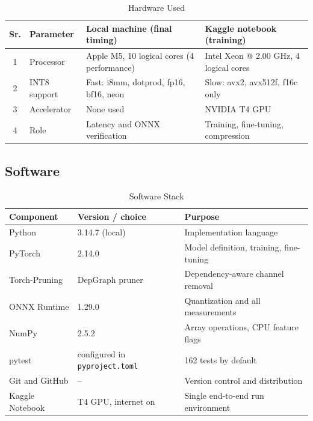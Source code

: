 \documentclass[oneside,a4paper,12pt]{report}
\newcommand{\code}[1]{\texttt{\small #1}}
\begin{document}
\begin{table}[!htbp]
\centering
\small
\begin{tabularx}{\textwidth}{@{}c l X X@{}}
\toprule
Sr. & Parameter & Local machine (final timing) & Kaggle notebook (training)\\
\midrule
1 & Processor & Apple M5, 10 logical cores (4 performance) & Intel Xeon @ 2.00 GHz, 4 logical cores\\
2 & INT8 support & Fast: i8mm, dotprod, fp16, bf16, neon & Slow: avx2, avx512f, f16c only\\
3 & Accelerator & None used & NVIDIA T4 GPU\\
4 & Role & Latency and ONNX verification & Training, fine-tuning, compression\\
\bottomrule
\end{tabularx}
\caption{Hardware Used}
\label{tab:hw}
\end{table}

\subsection{Software}

\begin{table}[!htbp]
\centering
\small
\begin{tabular}{@{}l l p{6.5cm}@{}}
\toprule
Component & Version / choice & Purpose\\
\midrule
Python & 3.14.7 (local) & Implementation language\\
PyTorch & 2.14.0 & Model definition, training, fine-tuning\\
Torch-Pruning & DepGraph pruner & Dependency-aware channel removal\\
ONNX Runtime & 1.29.0 & Quantization and all measurements\\
NumPy & 2.5.2 & Array operations, CPU feature flags\\
pytest & configured in \code{pyproject.toml} & 162 tests by default\\
Git and GitHub & -- & Version control and distribution\\
Kaggle Notebook & T4 GPU, internet on & Single end-to-end run environment\\
\bottomrule
\end{tabular}
\caption{Software Stack}
\label{tab:sw}
\end{table}
\end{document}
